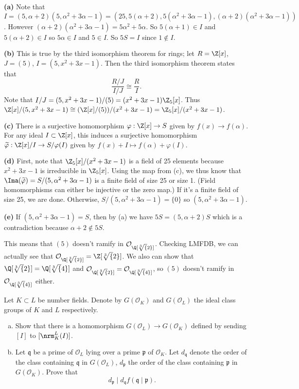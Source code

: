 \documentclass[11pt,letterpaper]{article}
\begin{document}
\begin{solution}
    \textbf{(a)} Note that $I=(5,\alpha+2)(5,\alpha^2+3\alpha-1)=(25, 5(\alpha+2), 5(\alpha^2+3\alpha-1), (\alpha+2)(\alpha^2+3\alpha-1))$. However $(\alpha+2)(\alpha^2+3\alpha-1)=5\alpha^2+5\alpha$. So $5(\alpha+1)\in I$ and $5(\alpha+2)\in I$ so $5\alpha\in I$ and $5\in I$. So $5S=I$ since $1\not\in I$. 
    
    \textbf{(b)} This is true by the third isomorphism theorem for rings; let $R=\Z[x]$, $J=(5)$, $I=(5,x^2+3x-1)$. Then the third isomorphism theorem states that 
    \[
        \frac{R/J}{I/J}\cong \frac{R}{I}
    .\]
    Note that $I/J=(5,x^2+3x-1) / (5) = (x^2+3x-1)\Z_5[x]$. Thus $\Z[x]/(5,x^2+3x-1)\cong (\Z[x] /(5)) / (x^2+3x-1) = \Z_5[x]/(x^2+3x-1)$.
    
    \textbf{(c)} There is a surjective homomorphism $\varphi : \Z[x] \to S$ given by $f(x) \to f(\alpha)$. For any ideal $I\subset \Z[x]$, this induces a surjective homomorphism $\widetilde{\varphi} : \Z[x]/I \to S/\varphi(I)$ given by $f(x)+I \mapsto f(\alpha)+\varphi(I)$.

    \textbf{(d)} First, note that $\Z_5[x]/(x^2+3x-1)$ is a field of 25 elements because $x^2+3x-1$ is irreducible in $\Z_5[x]$. Using the map from (c), we thus know that $\Ima(\widetilde{\varphi}) = S/(5,\alpha^2+3\alpha-1)$ is a finite field of size 25 or size 1. (Field homomorphisms can either be injective or the zero map.) If it's a finite field of size 25, we are done. Otherwise, $S/(5,\alpha^2+3\alpha-1)=\{0\}$ so $(5,\alpha^2+3\alpha-1)$.
    
    \textbf{(e)} If $(5,\alpha^2+3\alpha-1)=S$, then by (a) we have $5S=(5,\alpha+2)S$ which is a contradiction because $\alpha+2\not\in 5S$. 

    This means that $(5)$ doesn't ramify in $\mathcal{O}_{\Q[\sqrt[3]{2}]}$. Checking LMFDB, we can actually see that $\mathcal{O}_{\Q[\sqrt[3]{2}]}=\Z[\sqrt[3]{2}]$. We also can show that $\Q[\sqrt[3]{2}]=\Q[\sqrt[3]{4}]$ and $\mathcal{O}_{\Q[\sqrt[3]{2}]}=\mathcal{O}_{\Q[\sqrt[3]{4}]}$, so $(5)$ doesn't ramify in $\mathcal{O}_{\Q[\sqrt[3]{4}]}$ either. 
\end{solution}

\begin{cproblem}{3.16}
    Let $K\subset L$ be number fields. Denote by $G(\mathcal{O}_K)$ and $G(\mathcal{O}_L)$ the ideal class groups of $K$ and $L$ respectively.
    \begin{enumerate}[(a)]
        \item Show that there is a homomorphism $G(\mathcal{O}_L) \to G(\mathcal{O}_K)$ defined by sending $[I]$ to $[\nrm^L_K(I)]$. 
        \item Let $\mathfrak{q}$ be a prime of $\mathcal{O}_L$ lying over a prime $\mathfrak{p}$ of $\mathcal{O}_K$. Let $d_{\mathfrak{q}}$ denote the order of the class containing $\mathfrak{q}$ in $G(\mathcal{O}_L)$, $d_{\mathfrak{p}}$ the order of the class containing $\mathfrak{p}$ in $G(\mathcal{O}_K)$. Prove that
        \[
            d_{\mathfrak{p}} \mid d_{\mathfrak{q}}f(\mathfrak{q}\mid \mathfrak{p})    
        .\]     
    \end{enumerate}
\end{cproblem}
\end{document}
